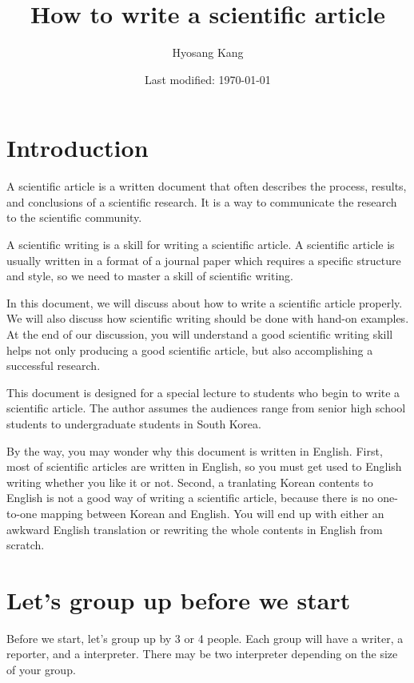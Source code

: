 \documentclass{article}
\title{How to write a scientific article}
\author{Hyosang Kang}
\date{Last modified: \today}
\begin{document}
\maketitle

\section{Introduction}

A scientific article is a written document that often describes the process, results, and conclusions of a scientific research. 
It is a way to communicate the research to the scientific community. 

A scientific writing is a skill for writing a scientific article.
A scientific article is usually written in a format of a journal paper which requires a specific structure and style, so we need to master a skill of scientific writing.

In this document, we will discuss about how to write a scientific article properly.
We will also discuss how scientific writing should be done with hand-on examples.
At the end of our discussion, you will understand a good scientific writing skill helps not only producing a good scientific article, but also accomplishing a successful research. 

This document is designed for a special lecture to students who begin to write a scientific article.
The author assumes the audiences range from senior high school students to undergraduate students in South Korea.

By the way, you may wonder why this document is written in English.
First, most of scientific articles are written in English, so you must get used to English writing whether you like it or not.
Second, a tranlating Korean contents to English is not a good way of writing a scientific article, because there is no one-to-one mapping between Korean and English. You will end up with either an awkward English translation or rewriting the whole contents in English from scratch.



\section{Let's group up before we start}

Before we start, let's group up by 3 or 4 people.
Each group will have a writer, a reporter, and a interpreter.
There may be two interpreter depending on the size of your group.
\end{document}
